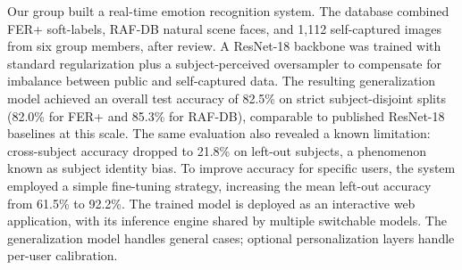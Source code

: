 \documentclass[12pt,a4paper]{article}
\begin{document}
Our group built a real-time emotion recognition system. The database combined FER+ soft-labels, RAF-DB natural scene faces, and 1,112 self-captured images from six group members, after review. A ResNet-18 backbone was trained with standard regularization plus a subject-perceived oversampler to compensate for imbalance between public and self-captured data. The resulting generalization model achieved an overall test accuracy of 82.5\% on strict subject-disjoint splits (82.0\% for FER+ and 85.3\% for RAF-DB), comparable to published ResNet-18 baselines at this scale. The same evaluation also revealed a known limitation: cross-subject accuracy dropped to 21.8\% on left-out subjects, a phenomenon known as subject identity bias. To improve accuracy for specific users, the system employed a simple fine-tuning strategy, increasing the mean left-out accuracy from 61.5\% to 92.2\%. The trained model is deployed as an interactive web application, with its inference engine shared by multiple switchable models. The generalization model handles general cases; optional personalization layers handle per-user calibration.

\newpage
\printbibliography
\end{document}
